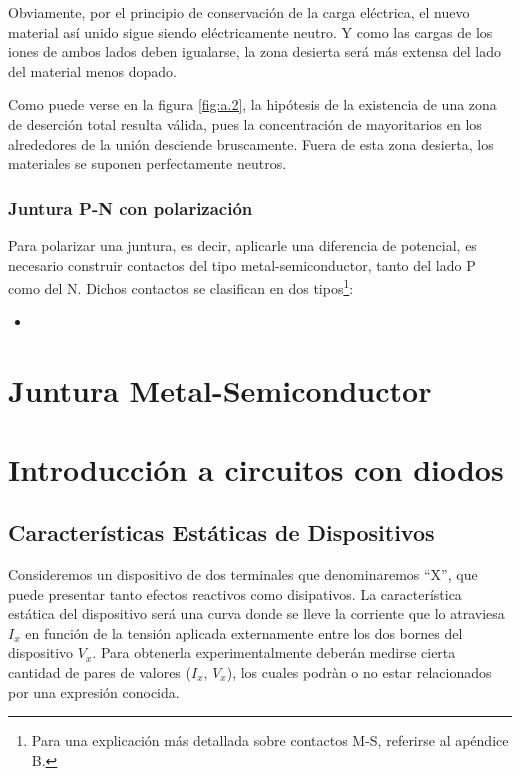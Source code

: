 \documentclass{book} %
\theoremstyle{definition}
\begin{document}
\begin{appendices}
Obviamente, por el principio de conservación de la carga eléctrica, el nuevo material así unido sigue siendo eléctricamente neutro. Y como las cargas de los iones de ambos lados deben igualarse, la zona desierta será más extensa del lado del material menos dopado.

Como puede verse en la figura \ref{fig:a.2}, la hipótesis de la existencia de una zona de deserción total resulta válida, pues la concentración de mayoritarios en los alrededores de la unión desciende bruscamente. Fuera de esta zona desierta, los materiales se suponen perfectamente neutros.

\subsection{Juntura P-N con polarización}

Para polarizar una juntura, es decir, aplicarle una diferencia de potencial, es necesario construir contactos del tipo metal-semiconductor, tanto del lado P como del N. Dichos contactos se clasifican en dos tipos\footnote{Para una explicación más detallada sobre contactos M-S, referirse al apéndice B.}:
\begin{itemize}
	\item 
\end{itemize}






\chapter{Juntura Metal-Semiconductor}
\chapter{Introducción a circuitos con diodos}
\section{Características Estáticas de Dispositivos}
Consideremos un dispositivo de dos terminales que denominaremos ``X'', que puede presentar tanto efectos reactivos como disipativos. La característica estática del dispositivo será una curva donde se lleve la corriente que lo atraviesa $I_x$ en función de la tensión aplicada externamente entre los dos bornes del dispositivo $V_x$. Para obtenerla experimentalmente deberán medirse cierta cantidad de pares de valores ($I_x$, $V_x$), los cuales podràn o no estar relacionados por una expresión conocida.


\end{appendices}
\end{document}

